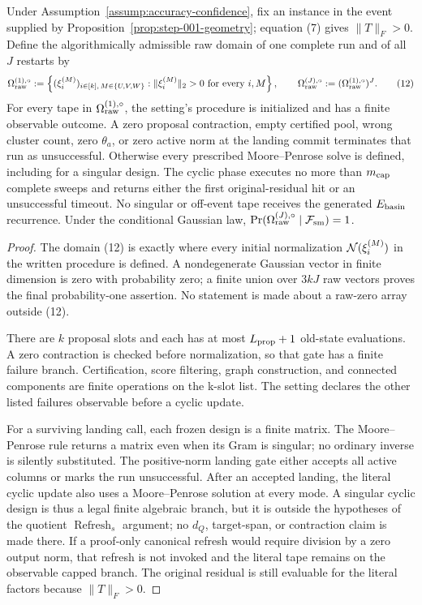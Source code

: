 \begin{proposition}\label{prop:step-012-finite-tapes}
Under Assumption~\ref{assump:accuracy-confidence}, fix an instance in the
event supplied by Proposition~\ref{prop:step-001-geometry}; equation (7)
gives \(\|T\|_F>0\). Define the
algorithmically admissible raw domain of one complete run and of all \(J\)
restarts by
\[
 \Omega_{\rm raw}^{(1),\circ}:=
 \left\{(\xi_i^{(M)})_{i\in[k],\,M\in\{U,V,W\}}:
   \|\xi_i^{(M)}\|_2>0\ \text{for every }i,M\right\},
 \qquad
 \Omega_{\rm raw}^{(J),\circ}:=
   (\Omega_{\rm raw}^{(1),\circ})^J.
\tag{12}
\]
For every tape in \(\Omega_{\rm raw}^{(1),\circ}\), the setting's procedure
is initialized and has a finite observable outcome. A zero proposal
contraction, empty certified pool, wrong cluster count, zero \(\theta_a\), or
zero active norm at the landing commit terminates that run as unsuccessful.
Otherwise every prescribed Moore--Penrose solve is defined, including for a
singular design. The cyclic phase executes no more than \(m_{\rm cap}\)
complete sweeps and returns either the first original-residual hit or an
unsuccessful timeout. No singular or off-event tape receives the generated
\(E_{\rm basin}\) recurrence. Under the conditional Gaussian law,
\(\Pr(\Omega_{\rm raw}^{(J),\circ}\mid{\cal F}_{\rm sm})=1\).

\begin{proof}
The domain (12) is exactly where every initial normalization
\({\cal N}(\xi_i^{(M)})\) in the written procedure is defined. A nondegenerate
Gaussian vector in finite dimension is zero with probability zero; a finite
union over \(3kJ\) raw vectors proves the final probability-one assertion.
No statement is made about a raw-zero array outside (12).

There are \(k\) proposal slots and each has at most
\(L_{\rm prop}+1\) old-state evaluations. A zero contraction is checked before
normalization, so that gate has a finite failure branch. Certification,
score filtering, graph construction, and connected components are finite
operations on the k-slot list. The setting declares the other listed
failures observable before a cyclic update.

For a surviving landing call, each frozen design is a finite matrix. The
Moore--Penrose rule returns a matrix even when its Gram is singular; no
ordinary inverse is silently substituted. The positive-norm landing gate
either accepts all active columns or marks the run unsuccessful. After an
accepted landing, the literal cyclic update also uses a Moore--Penrose
solution at every mode. A singular cyclic design is thus a legal finite
algebraic branch, but it is outside the hypotheses of the quotient
$\operatorname{Refresh}_s$ argument; no $d_Q$, target-span, or contraction
claim is made there.
If a proof-only canonical refresh would require division by a zero output
norm, that refresh is not invoked and the literal tape remains on the
observable capped branch. The original residual is still evaluable for the
literal factors because \(\|T\|_F>0\).


\end{proof}
\end{proposition}
